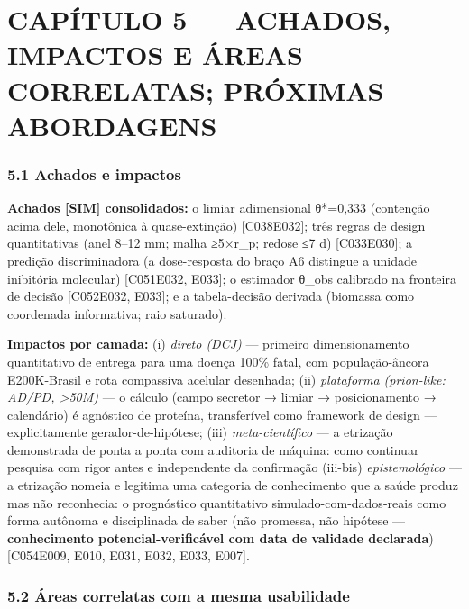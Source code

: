 \documentclass[
  10pt,
]{article}
\begin{document}
\hypertarget{capuxedtulo-5-achados-impactos-e-uxe1reas-correlatas-pruxf3ximas-abordagens}{%
\section{CAPÍTULO 5 --- ACHADOS, IMPACTOS E ÁREAS CORRELATAS; PRÓXIMAS
ABORDAGENS}\label{capuxedtulo-5-achados-impactos-e-uxe1reas-correlatas-pruxf3ximas-abordagens}}

\hypertarget{achados-e-impactos}{%
\subsubsection{5.1 Achados e impactos}\label{achados-e-impactos}}

\textbf{Achados {[}SIM{]} consolidados:} o limiar adimensional θ*=0,333
(contenção acima dele, monotônica à quase-extinção)
{[}C038\textbar E032{]}; três regras de design quantitativas (anel 8--12
mm; malha ≥5×r\_p; redose ≤7 d) {[}C033\textbar E030{]}; a predição
discriminadora (a dose-resposta do braço A6 distingue a unidade
inibitória molecular) {[}C051\textbar E032, E033{]}; o estimador θ\_obs
calibrado na fronteira de decisão {[}C052\textbar E032, E033{]}; e a
tabela-decisão derivada (biomassa como coordenada informativa; raio
saturado).

\textbf{Impactos por camada:} (i) \emph{direto (DCJ)} --- primeiro
dimensionamento quantitativo de entrega para uma doença 100\% fatal, com
população-âncora E200K-Brasil e rota compassiva acelular desenhada; (ii)
\emph{plataforma (prion-like: AD/PD, \textgreater50M)} --- o cálculo
(campo secretor → limiar → posicionamento → calendário) é agnóstico de
proteína, transferível como framework de design --- explicitamente
gerador-de-hipótese; (iii) \emph{meta-científico} --- a etrização
demonstrada de ponta a ponta com auditoria de máquina: como continuar
pesquisa com rigor antes e independente da confirmação (iii-bis)
\emph{epistemológico} --- a etrização nomeia e legitima uma categoria de
conhecimento que a saúde produz mas não reconhecia: o prognóstico
quantitativo simulado-com-dados-reais como forma autônoma e disciplinada
de saber (não promessa, não hipótese --- \textbf{conhecimento
potencial-verificável com data de validade declarada})
{[}C054\textbar E009, E010, E031, E032, E033, E007{]}.

\hypertarget{uxe1reas-correlatas-com-a-mesma-usabilidade}{%
\subsubsection{5.2 Áreas correlatas com a mesma
usabilidade}\label{uxe1reas-correlatas-com-a-mesma-usabilidade}}
\end{document}
